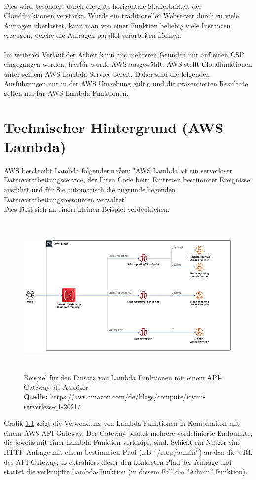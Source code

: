 \documentclass[12pt,a4paper,parskip=half]{scrreprt}
\newcommand*{\captionsource}[2]{%
	\caption[{#1}]{%
		#1%
		\\\hspace{\linewidth}%
		\textbf{Quelle:} #2%
	}%
}
\begin{document}
\\
Dies wird besonders durch die gute horizontale Skalierbarkeit der Cloudfunktionen verstärkt. Würde ein traditioneller Webserver durch zu viele Anfragen überlastet, kann man von einer Funktion beliebig viele Instanzen erzeugen, welche die Anfragen parallel verarbeiten können.
\\
\\
Im weiteren Verlauf der Arbeit kann aus mehreren Gründen nur auf einen CSP eingegangen werden, hierfür wurde AWS ausgewählt. AWS stellt Cloudfunktionen unter seinem AWS-Lambda Service bereit. Daher sind die folgenden Ausführungen nur in der AWS Umgebung gültig und die präsentierten Resultate gelten nur für AWS-Lambda Funktionen.
\cite{Lambda-overview} 

\chapter{Technischer Hintergrund (AWS Lambda)}
AWS beschreibt Lambda folgendermaßen: "AWS Lambda ist ein serverloser Datenverarbeitungsservice, der Ihren Code beim Eintreten bestimmter Ereignisse ausführt und für Sie automatisch die zugrunde liegenden Datenverarbeitungsressourcen verwaltet" \cite{Lambda-overview}
\\
Dies lässt sich an einem kleinen Beispiel verdeutlichen:
\FloatBarrier
\begin{figure}[h!]
	\centering
	\includegraphics[width=14cm, height=8cm]{LambdaExample}
	\captionsource{Beispiel für den Einsatz von Lambda Funktionen mit einem API-Gateway als Auslöser}
		{https://aws.amazon.com/de/blogs/compute/icymi-serverless-q1-2021/}
	\label{AWS_Example}
\end{figure}

Grafik \ref{AWS_Example} zeigt die Verwendung von Lambda Funktionen in Kombination mit einem AWS API Gateway. Der Gateway besitzt mehrere vordefinierte Endpunkte, die jeweils mit einer Lambda-Funktion verknüpft sind. Schickt ein Nutzer eine HTTP Anfrage mit einem bestimmten Pfad (z.B ''/corp/admin'') an den die URL des API Gateway, so extrahiert dieser den konkreten Pfad der Anfrage und startet die verknüpfte Lambda-Funktion (in diesem Fall die ''Admin'' Funktion).
\end{document}

